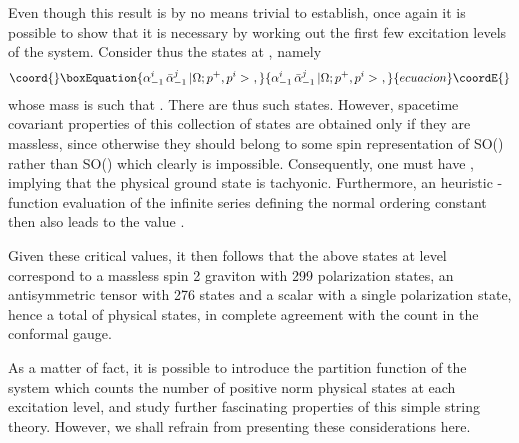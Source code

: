 \documentclass[a4paper,11pt]{article}
\begin{document}
Even though this result is by no means trivial to establish, once
again it is possible to show that it is necessary by working out the
first few excitation levels of the system. Consider thus the states
at \coordHE{}, namely
\begin{equation}\coord{}\boxEquation{
\alpha^i_{-1}\,\bar{\alpha}^j_{-1}\,|\Omega;p^+,p^i>\ ,
}{
\alpha^i_{-1}\,\bar{\alpha}^j_{-1}\,|\Omega;p^+,p^i>\ ,
}{ecuacion}\coordE{}\end{equation}
whose mass is such that \coordHE{}. There are thus \coordHE{}
such states. However, spacetime covariant properties of this collection
of states are obtained only if they are massless, since otherwise they
should belong to some spin representation of SO(\coordHE{}) rather than SO(\coordHE{})
which clearly is impossible. Consequently, one must have \coordHE{}, implying 
that the physical ground state is tachyonic. Furthermore, an heuristic 
\myHighlight{$\zeta$}\coordHE{}-function evaluation of the infinite series defining the normal 
ordering constant \coordHE{} then also leads to the value \coordHE{}. 

Given these critical values, it then follows that the above states at level 
\coordHE{} correspond to a massless spin 2 graviton with 
299 polarization states, an antisymmetric tensor with 276 states and a 
scalar with a single polarization state, hence a total of \coordHE{} 
physical states, in complete agreement with the count in the conformal gauge.

As a matter of fact, it is possible to introduce the partition function
of the system which counts the number of positive norm physical states
at each excitation level, and study further fascinating properties
of this simple string theory. However, we shall refrain from presenting
these considerations here.
\end{document}

